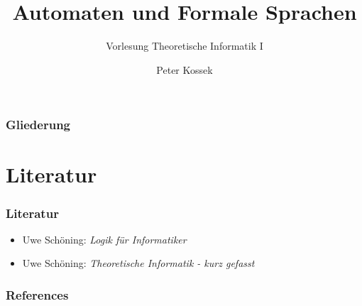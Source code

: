 \documentclass[18pt,aspectratio=169]{beamer}
\title{Automaten und Formale Sprachen}
\subtitle{Vorlesung Theoretische Informatik I}
\author{Peter Kossek}
\institute{Berufsakademie Sachsen, Staatliche Studienakademie Leipzig} %
\date{}
\begin{document}
\begin{frame}
	\titlepage
\end{frame}

\begin{frame}
	\frametitle{Gliederung}
	\tableofcontents
\end{frame}

\section{Literatur}
\begin{frame}
	\frametitle{Literatur}
	\begin{itemize}
		\item Uwe Schöning: \textit{Logik für Informatiker}
		\item Uwe Schöning: \textit{Theoretische Informatik - kurz gefasst}
	\end{itemize}
\end{frame}



\begin{frame}
	\frametitle{References}
	
\end{frame}
\end{document}
